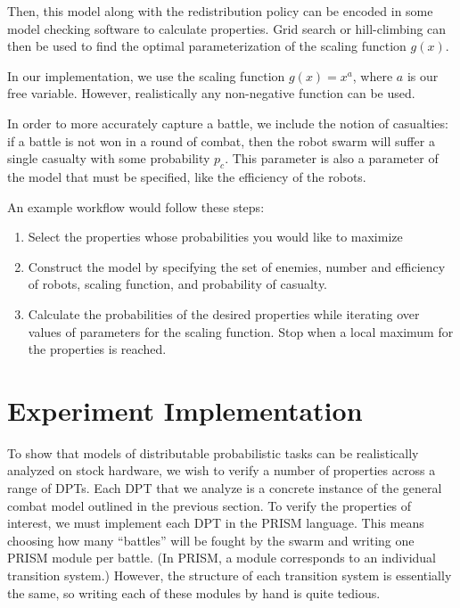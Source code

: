\documentclass[11pt]{article}
\theoremstyle{definition}
\begin{document}
Then, this model along with the redistribution
policy can be encoded in some model checking software
to calculate properties. Grid search or hill-climbing can
then be used to find the optimal parameterization of
the scaling function $g(x)$.

In our implementation, we use the scaling function $g(x) = x^a$,
where $a$ is our free variable.
However, realistically any non-negative function can be used.

In order to more accurately capture a battle, we include
the notion of casualties: if a battle is not won in a round
of combat, then the robot swarm will suffer
a single casualty with some probability $p_c$.
This parameter is also a parameter of the model
that must be specified, like the efficiency of the robots.

An example workflow would follow these steps:

\begin{enumerate}
    \item
        Select the properties whose probabilities you would like to maximize
    \item
        Construct the model by specifying the set of enemies, number and
        efficiency of robots, scaling function, and probability of casualty.
    \item
        Calculate the probabilities of the desired properties while iterating
        over values of parameters for the scaling function.
        Stop when a local maximum for the properties is reached.
\end{enumerate}

\section{Experiment Implementation}
\label{sec:implementation}

To show that models of distributable probabilistic tasks can be realistically
analyzed on stock hardware, we wish to verify a number of properties across a
range of DPTs.
Each DPT that we analyze is a concrete instance of the general combat model
outlined in the previous section.
To verify the properties of interest, we must implement each DPT in the PRISM
language.
This means choosing how many ``battles'' will be fought by the swarm and
writing one PRISM module per battle.
(In PRISM, a module corresponds to an individual transition system.)
However, the structure of each transition system is essentially the same, so
writing each of these modules by hand is quite tedious.
\end{document}
